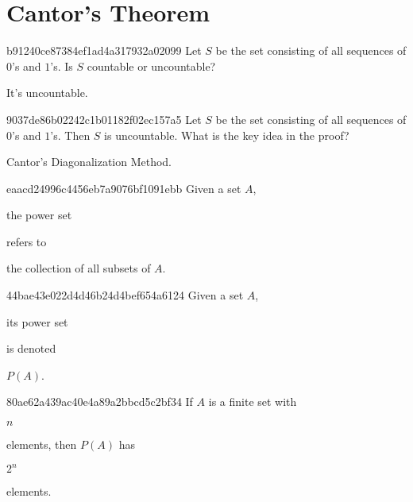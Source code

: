 \section{Cantor's Theorem}
\begin{note}{b91240ce87384ef1ad4a317932a02099}
    Let \({ S }\) be the set consisting of all sequences of \({ 0 }\)'s and \({ 1 }\)'s.
    Is \({ S }\) countable or uncountable?

    \begin{cloze}{1}
        It's uncountable.
    \end{cloze}
\end{note}

\begin{note}{9037de86b02242c1b01182f02ec157a5}
    Let \({ S }\) be the set consisting of all sequences of \({ 0 }\)'s and \({ 1 }\)'s.
    Then \({ S }\) is uncountable.
    What is the key idea in the proof?

    \begin{cloze}{1}
        Cantor's Diagonalization Method.
    \end{cloze}
\end{note}

\begin{note}{eaacd24996c4456eb7a9076bf1091ebb}
    Given a set \({ A }\), \begin{icloze}{2}the power set\end{icloze} refers to \begin{icloze}{1}the collection of all subsets of \({ A }\).\end{icloze}
\end{note}

\begin{note}{44bae43e022d4d46b24d4bef654a6124}
    Given a set \({ A }\), \begin{icloze}{2}its power set\end{icloze} is denoted \begin{icloze}{1}\({ P(A) }\).\end{icloze}
\end{note}

\begin{note}{80ae62a439ac40e4a89a2bbcd5c2bf34}
    If \({ A }\) is a finite set with \begin{icloze}{2}\({ n }\)\end{icloze} elements, then \({ P(A) }\) has \begin{icloze}{1}\({ 2^{n} }\)\end{icloze} elements.
\end{note}

